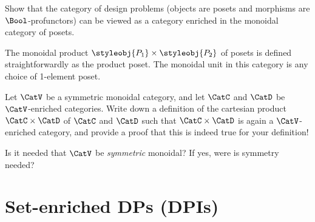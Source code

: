 \begin{gradedexercise}
    \label{ex:DPIsEnrichedInPos}
    Show that the category of design problems (objects are posets and morphisms are $\Bool$-profunctors) can be viewed as a category enriched in the monoidal category of posets.



    The monoidal product $\styleobj{P_1} \times \styleobj{P_2}$ of posets is defined straightforwardly as the product poset.
    The monoidal unit in this category is any choice of 1-element poset.
\end{gradedexercise}


\begin{gradedexercise}
    \label{ex:ProductOfEnrichedCats}
    Let $\CatV$ be a symmetric monoidal category, and let $\CatC$ and $\CatD$ be $\CatV$-enriched categories.
    Write down a definition of the cartesian product $\CatC \times \CatD$ of $\CatC$ and $\CatD$ such that $\CatC \times \CatD$ is again a $\CatV$-enriched category, and provide a proof that this is indeed true for your definition!

    Is it needed that $\CatV$ be \emph{symmetric} monoidal?
    If yes, were is symmetry needed?
\end{gradedexercise}

\section{Set-enriched DPs (DPIs)}

